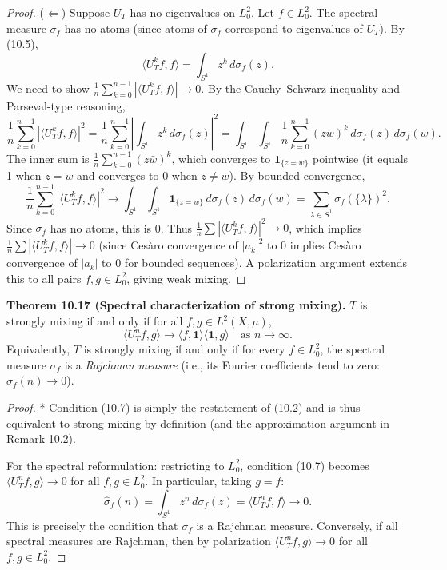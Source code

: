 \begin{proof}
($\Leftarrow$) Suppose $U_T$ has no eigenvalues on $L^2_0$. Let $f \in L^2_0$. The spectral measure $\sigma_f$ has no atoms (since atoms of $\sigma_f$ correspond to eigenvalues of $U_T$). By (10.5),
\[
\langle U_T^k f, f\rangle = \int_{S^1} z^k \, d\sigma_f(z).
\]
We need to show $\frac{1}{n}\sum_{k=0}^{n-1}|\langle U_T^k f, f\rangle| \to 0$. By the Cauchy--Schwarz inequality and Parseval-type reasoning,
\[
\frac{1}{n}\sum_{k=0}^{n-1} |\langle U_T^k f, f\rangle|^2 = \frac{1}{n}\sum_{k=0}^{n-1}\left|\int_{S^1} z^k \, d\sigma_f(z)\right|^2 = \int_{S^1}\int_{S^1} \frac{1}{n}\sum_{k=0}^{n-1}(z\bar{w})^k \, d\sigma_f(z)\, d\sigma_f(w).
\]
The inner sum is $\frac{1}{n}\sum_{k=0}^{n-1}(z\bar{w})^k$, which converges to $\mathbf{1}_{\{z = w\}}$ pointwise (it equals 1 when $z = w$ and converges to 0 when $z \ne w$). By bounded convergence,
\[
\frac{1}{n}\sum_{k=0}^{n-1}|\langle U_T^k f, f\rangle|^2 \to \int_{S^1}\int_{S^1}\mathbf{1}_{\{z = w\}} \, d\sigma_f(z)\, d\sigma_f(w) = \sum_{\lambda \in S^1} \sigma_f(\{\lambda\})^2.
\]
Since $\sigma_f$ has no atoms, this is 0. Thus $\frac{1}{n}\sum |\langle U_T^k f, f\rangle|^2 \to 0$, which implies $\frac{1}{n}\sum |\langle U_T^k f, f \rangle| \to 0$ (since Cesàro convergence of $|a_k|^2$ to 0 implies Cesàro convergence of $|a_k|$ to 0 for bounded sequences). A polarization argument extends this to all pairs $f, g \in L^2_0$, giving weak mixing.
\end{proof}


\textbf{Theorem 10.17 (Spectral characterization of strong mixing).} $T$ is strongly mixing if and only if for all $f, g \in L^2(X, \mu)$,
\begin{equation}\label{eq:10.7}\tag{10.7}
\langle U_T^n f, g \rangle \to \langle f, \mathbf{1}\rangle \langle \mathbf{1}, g \rangle \quad \text{as } n \to \infty.
\end{equation}
Equivalently, $T$ is strongly mixing if and only if for every $f \in L^2_0$, the spectral measure $\sigma_f$ is a \textit{Rajchman measure} (i.e., its Fourier coefficients tend to zero: $\hat{\sigma}_f(n) \to 0$).

\begin{proof}
* Condition (10.7) is simply the restatement of (10.2) and is thus equivalent to strong mixing by definition (and the approximation argument in Remark 10.2).

For the spectral reformulation: restricting to $L^2_0$, condition (10.7) becomes $\langle U_T^n f, g \rangle \to 0$ for all $f, g \in L^2_0$. In particular, taking $g = f$:
\[
\hat{\sigma}_f(n) = \int_{S^1} z^n \, d\sigma_f(z) = \langle U_T^n f, f \rangle \to 0.
\]
This is precisely the condition that $\sigma_f$ is a Rajchman measure. Conversely, if all spectral measures are Rajchman, then by polarization $\langle U_T^n f, g \rangle \to 0$ for all $f, g \in L^2_0$.
\end{proof}


